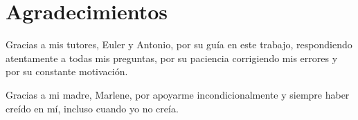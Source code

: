 \chapter*{Agradecimientos}

\par Gracias a mis tutores, Euler y Antonio, por su guía en este trabajo, respondiendo atentamente a todas mis preguntas, por su paciencia corrigiendo mis errores y por su constante motivación.
\\
\par Gracias a mi madre, Marlene, por apoyarme incondicionalmente y siempre haber creído en mí, incluso cuando yo no creía.
